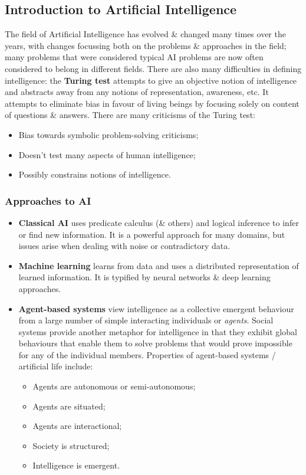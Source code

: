 \documentclass[a4paper,11pt]{article}
\begin{document}
\subsection{Introduction to Artificial Intelligence}
The field of Artificial Intelligence has evolved \& changed many times over the years, with changes focussing both on the problems \& approaches in the field;
many problems that were considered typical AI problems are now often considered to belong in different fields.
There are also many difficulties in defining intelligence: the \textbf{Turing test} attempts to give an objective notion of intelligence and abstracts away from any notions of representation, awareness, etc.
It attempts to eliminate bias in favour of living beings by focusing solely on content of questions \& answers.
There are many criticisms of the Turing test:
\begin{itemize}
    \item   Bias towards symbolic problem-solving criticisms;
    \item   Doesn't test many aspects of human intelligence;
    \item   Possibly constrains notions of intelligence.
\end{itemize}

\subsubsection{Approaches to AI}
\begin{itemize}
    \item   \textbf{Classical AI} uses predicate calculus (\& others) and logical inference to infer or find new information.
            It is a powerful approach for many domains, but issues arise when dealing with noise or contradictory data.

    \item   \textbf{Machine learning} learns from data and uses a distributed representation of learned information.
            It is typified by neural networks \& deep learning approaches.

    \item   \textbf{Agent-based systems} view intelligence as a collective emergent behaviour from a large number of simple interacting individuals or \textit{agents}.
            Social systems provide another metaphor for intelligence in that they exhibit global behaviours that enable them to solve problems that would prove impossible for any of the individual members.
            Properties of agent-based systems / artificial life include:
            \begin{itemize}
                \item   Agents are autonomous or semi-autonomous;
                \item   Agents are situated;
                \item   Agents are interactional;
                \item   Society is structured;
                \item   Intelligence is emergent.
            \end{itemize}
\end{itemize}
\end{document}
